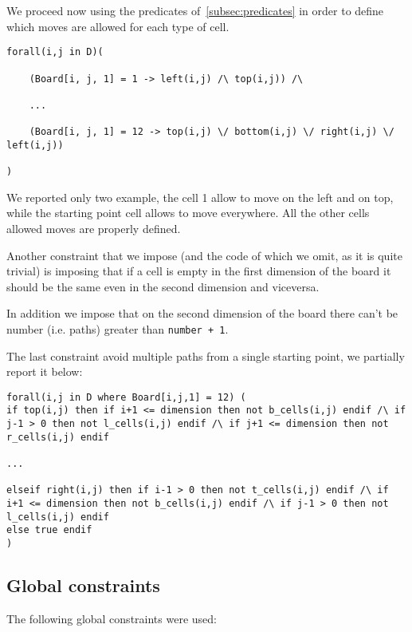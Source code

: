 We proceed now using the predicates of~\ref{subsec:predicates} in order to define which moves are allowed for each type of cell.


\begin{verbatim}
forall(i,j in D)(

    (Board[i, j, 1] = 1 -> left(i,j) /\ top(i,j)) /\

    ...

    (Board[i, j, 1] = 12 -> top(i,j) \/ bottom(i,j) \/ right(i,j) \/ left(i,j))

)
\end{verbatim}

We reported only two example, the cell 1 allow to move on the left and on top, while the starting point cell allows to move everywhere. All the other cells allowed moves are properly defined.

Another constraint that we impose (and the code of which we omit, as it is quite trivial) is imposing that if a cell is empty in the first dimension of the board it should be the same even in the second dimension and viceversa.

In addition we impose that on the second dimension of the board there can't be number (i.e. paths) greater than \texttt{number + 1}.

The last constraint avoid multiple paths from a single starting point, we partially report it below:

\begin{verbatim}
forall(i,j in D where Board[i,j,1] = 12) (
if top(i,j) then if i+1 <= dimension then not b_cells(i,j) endif /\ if j-1 > 0 then not l_cells(i,j) endif /\ if j+1 <= dimension then not r_cells(i,j) endif

...

elseif right(i,j) then if i-1 > 0 then not t_cells(i,j) endif /\ if i+1 <= dimension then not b_cells(i,j) endif /\ if j-1 > 0 then not l_cells(i,j) endif
else true endif
)
\end{verbatim}


\subsection{Global constraints}
The following global constraints were used:



